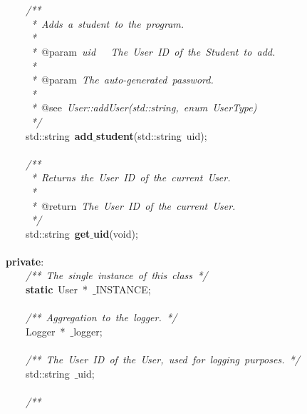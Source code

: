 \mbox{} \\
\mbox{} \\
\mbox{}\ \ \ \ \textit{/**} \\
\mbox{}\textit{\ \ \ \ \ *\ Adds\ a\ student\ to\ the\ program.} \\
\mbox{}\textit{\ \ \ \ \ *} \\
\mbox{}\textit{\ \ \ \ \ *\ }@param\textit{\ uid\ \ \ The\ User\ ID\ of\ the\ Student\ to\ add.} \\
\mbox{}\textit{\ \ \ \ \ *} \\
\mbox{}\textit{\ \ \ \ \ *\ }@param\textit{\ The\ auto-generated\ password.} \\
\mbox{}\textit{\ \ \ \ \ *} \\
\mbox{}\textit{\ \ \ \ \ *\ }@see\textit{\ User::addUser(std::string,\ enum\ UserType)} \\
\mbox{}\textit{\ \ \ \ \ */} \\
\mbox{}\ \ \ \ std::string\ \textbf{add$\_$student}(std::string\ uid); \\
\mbox{} \\
\mbox{}\ \ \ \ \textit{/**} \\
\mbox{}\textit{\ \ \ \ \ *\ Returns\ the\ User\ ID\ of\ the\ current\ User.} \\
\mbox{}\textit{\ \ \ \ \ *} \\
\mbox{}\textit{\ \ \ \ \ *\ }@return\textit{\ The\ User\ ID\ of\ the\ current\ User.} \\
\mbox{}\textit{\ \ \ \ \ */} \\
\mbox{}\ \ \ \ std::string\ \textbf{get$\_$uid}(void); \\
\mbox{} \\
\mbox{}\textbf{private}: \\
\mbox{}\ \ \ \ \textit{/**\ The\ single\ instance\ of\ this\ class\ */} \\
\mbox{}\ \ \ \ \textbf{static}\ User\ *\ $\_$INSTANCE; \\
\mbox{} \\
\mbox{}\ \ \ \ \textit{/**\ Aggregation\ to\ the\ logger.\ */} \\
\mbox{}\ \ \ \ Logger\ *\ $\_$logger; \\
\mbox{} \\
\mbox{}\ \ \ \ \textit{/**\ The\ User\ ID\ of\ the\ User,\ used\ for\ logging\ purposes.\ */} \\
\mbox{}\ \ \ \ std::string\ $\_$uid; \\
\mbox{} \\
\mbox{}\ \ \ \ \textit{/**} \\
